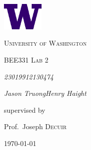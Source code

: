 \documentclass[9pt,a4paper]{report}
\begin{document}
	\begin{titlepage}
		\centering
		\vspace*{1.5in}
		\includegraphics[width=0.15\textwidth]{W-Logo_Purple_RGB}\par\vspace{1cm}
		{\LARGE \textsc{University of Washington}\par}
		\vspace{1cm}
		{\Large \textsc{BEE331 Lab 2}\par}
		\vspace{1.5cm}
		{\huge\bfseries \par}
		\vspace{2cm}
		{\Large\itshape 2301991\hspace{55pt}2130474\par}
		{\Large\itshape Jason Truong\hspace{31pt}Henry Haight\par}
		\vfill
		supervised by\par
		Prof.~Joseph \textsc{Decuir}
		\date{2024\\ January}
		\vfill
		{\large \today\par}
		\vspace*{1.5in}
	\end{titlepage}
	
\end{document}
